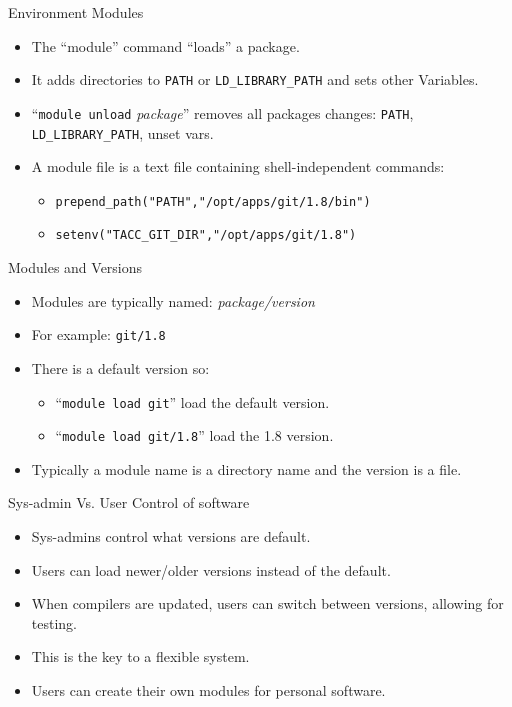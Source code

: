\documentclass{beamer}
\begin{document}
\begin{frame}{Environment Modules}
  \begin{itemize}
    \item The ``module'' command ``loads'' a package.
    \item It adds directories to \texttt{PATH} or \texttt{LD\_LIBRARY\_PATH} and
      sets other  Variables.
    \item ``\texttt{module unload} \emph{package}'' removes all packages
      changes: \texttt{PATH}, \texttt{LD\_LIBRARY\_PATH}, unset vars.
    \item A module file is a text file containing shell-independent commands:
      \begin{itemize}
        \item \texttt{prepend\_path("PATH","/opt/apps/git/1.8/bin")}
        \item \texttt{setenv("TACC\_GIT\_DIR","/opt/apps/git/1.8")}
      \end{itemize}
  \end{itemize}
\end{frame}

\begin{frame}{Modules and Versions}
  \begin{itemize}
    \item Modules are typically named: \emph{package/version}
    \item For example: \texttt{git/1.8}
    \item There is a default version so:
      \begin{itemize}
        \item ``\texttt{module load git}'' load the default version.
        \item ``\texttt{module load git/1.8}'' load the 1.8 version.
      \end{itemize}
    \item Typically a module name is a directory name and the version
      is a file.
  \end{itemize}
\end{frame}

\begin{frame}{Sys-admin Vs. User Control of software}
  \begin{itemize}
    \item Sys-admins control what versions are default.
    \item Users can load newer/older versions instead of the default.
    \item When compilers are updated, users can switch between
      versions, allowing for testing.
    \item This is the key to a flexible system.
    \item Users can create their own modules for personal software.
  \end{itemize}
\end{frame}
\end{document}
